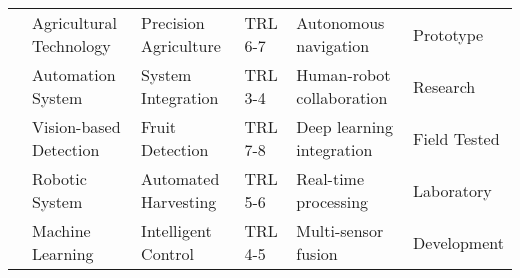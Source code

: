 \begin{table*}[htbp]
\begin{tabular}{@{}p{}p{}p{}p{}p{}p{}@{}}
\cite{r2018research} & Agricultural Technology & Precision Agriculture & TRL 6-7 & Autonomous navigation & Prototype \\
\cite{zhang2020technology} & Automation System & System Integration & TRL 3-4 & Human-robot collaboration & Research \\
\cite{sharma2020machine} & Vision-based Detection & Fruit Detection & TRL 7-8 & Deep learning integration & Field Tested \\
\cite{zhao2013design} & Robotic System & Automated Harvesting & TRL 5-6 & Real-time processing & Laboratory \\
\cite{wang2013reconfigurable} & Machine Learning & Intelligent Control & TRL 4-5 & Multi-sensor fusion & Development \\
\bottomrule
\end{tabular}
\end{table*}